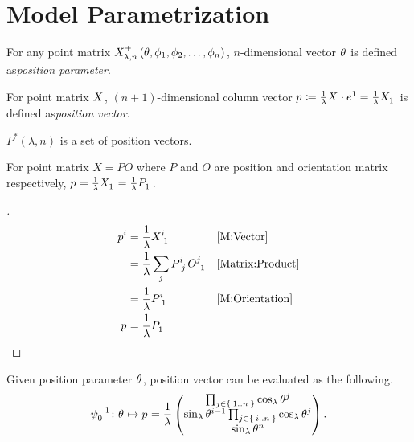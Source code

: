 \documentclass[../main.tex]{subfiles}
\begin{document}
\section{Model Parametrization}
\begin{definition}\label{M:Parameter}
For any point matrix \(\tensor{X^\pm_{\lambda,n}\left(\theta,\phi_1,\phi_2,\dots,\phi_n\right)}{}\),
\(n\)-dimensional vector \(\tensor{\theta}{}\)
is defined as\textit{position parameter}.
\end{definition}
\begin{definition}\label{M:Vector}
For point matrix \(\tensor{X}{}\),
\(\left(n+1\right)\)-dimensional column vector \(\tensor{p}{}\coloneqq\frac{1}{\lambda}\tensor{X}{}\cdot\tensor{e}{^1}=\frac{1}{\lambda}\tensor{X}{_1}\)
is defined as\textit{position vector}.
\end{definition}
\begin{definition}\label{M:Vector:Set}
\(P^\ast\left(\lambda,n\right)\) is a set of position vectors.
\end{definition}
\begin{lemma}\label{M:Vector:Position}
For point matrix \(X=PO\)
where \(P\) and \(O\) are position and orientation matrix respectively,
\(\tensor{p}{}=\frac{1}{\lambda}\tensor{X}{_1}=\frac{1}{\lambda}\tensor{P}{_1}\).
\end{lemma}
\begin{proof}[]
\begin{align*}
\tensor{p}{^i}
&=\frac{1}{\lambda}\tensor{X}{^i_1}&&\text{\cref{M:Vector}}\\
&=\frac{1}{\lambda}\sum_j{\tensor{P}{^i_j}\tensor{O}{^j_1}}&&\text{\cref{Matrix:Product}}\\
&=\frac{1}{\lambda}\tensor{P}{^i_1}&&\text{\cref{M:Orientation}}\\
\tensor{p}{}
&=\frac{1}{\lambda}\tensor{P}{_1}&&\qedhere
\end{align*}
\end{proof}
\begin{lemma}\label{M:Vector:Value}
Given position parameter \(\tensor{\theta}{}\), position vector can be evaluated as the following.
\[
\psi_0^{-1}\colon\tensor{\theta}{}\mapsto\tensor{p}{}
=\frac{1}{\lambda}
\begin{pmatrix}
\prod_{j\in\Set{1..n}}{\cos_\lambda{\tensor{\theta}{^j}}}\\
\sin_\lambda{\tensor{\theta}{^{i-1}}}\prod_{j\in\Set{i..n}}{\cos_\lambda{\tensor{\theta}{^j}}}\\
\sin_\lambda{{\tensor{\theta}{^n}}}\\
\end{pmatrix}\text{.}
\]
\end{lemma}
\end{document}
